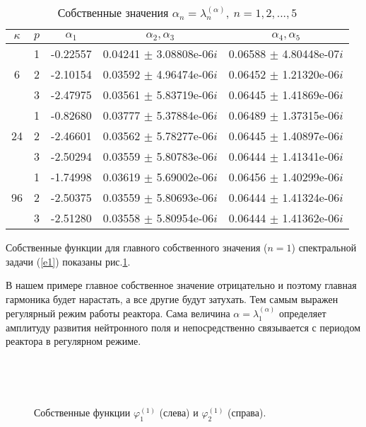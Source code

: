 \begin{table}[H]
\caption{Собственные значения $\alpha_n = \lambda_n^{(\alpha )}, \ n = 1,2, ..., 5$}
\label{t-3}
\begin{center}
\begin{tabular}{|c|c|c|c|c|}
\hline
$\kappa$ & $p$ & $\alpha_1$ &  $\alpha_2, \alpha_3$ &  $\alpha_4, \alpha_5$ \\ 
\hline
   & 1 & -0.22557 & 0.04241 $\pm$ 3.08808e-06$i$  & 0.06588 $\pm$ 4.80448e-07$i$  \\
6  & 2 & -2.10154 & 0.03592 $\pm$ 4.96474e-06$i$  & 0.06452 $\pm$ 1.21320e-06$i$  \\
   & 3 & -2.47975 & 0.03561 $\pm$ 5.83719e-06$i$  &  0.06445 $\pm$ 1.41869e-06$i$  \\
\hline
   & 1 & -0.82680 & 0.03777 $\pm$ 5.37884e-06$i$  & 0.06489 $\pm$ 1.37315e-06$i$  \\
24 & 2 & -2.46601 & 0.03562 $\pm$ 5.78277e-06$i$  & 0.06445 $\pm$ 1.40897e-06$i$  \\
   & 3 & -2.50294 & 0.03559 $\pm$ 5.80783e-06$i$  & 0.06444 $\pm$ 1.41341e-06$i$  \\
\hline
   & 1 & -1.74998 & 0.03619 $\pm$ 5.69002e-06$i$  & 0.06456 $\pm$ 1.40299e-06$i$  \\
96 & 2 & -2.50375 & 0.03559 $\pm$ 5.80693e-06$i$  & 0.06444 $\pm$ 1.41324e-06$i$  \\
   & 3 & -2.51280 & 0.03558 $\pm$ 5.80954e-06$i$  & 0.06444 $\pm$ 1.41362e-06$i$  \\
\hline

\end{tabular}
\end{center}
\end{table}
Собственные функции для главного собственного значения ($n=1$) спектральной задачи (\ref{e1})  показаны рис.\ref{fig:s1}. 

В нашем примере главное собственное значение
отрицательно и поэтому главная гармоника
будет нарастать, а все другие будут затухать. Тем самым выражен регулярный режим 
работы реактора. Сама величина $\alpha = \lambda_1^{(\alpha)}$ определяет амплитуду 
развития нейтронного поля и непосредственно связывается с периодом реактора
в регулярном режиме.

\begin{figure}[H]
  \begin{center}
\begin{minipage}{0.49\linewidth}
 \\
\end{minipage}
\hfill
\begin{minipage}{0.49\linewidth}
 \\
\end{minipage}
\caption{Собственные функции $\varphi^{(1)}_1$ (слева) и $\varphi^{(1)}_2$ (справа).}
\label{fig:s1}
  \end{center}
\end{figure}

